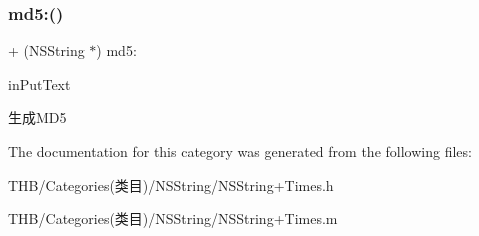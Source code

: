 \subsubsection{\texorpdfstring{md5\+:()}{md5:()}}
{\footnotesize\ttfamily + (N\+S\+String $\ast$) md5\+: \begin{DoxyParamCaption}\item[{(N\+S\+String $\ast$)}]{in\+Put\+Text }\end{DoxyParamCaption}}

生成\+M\+D5 

The documentation for this category was generated from the following files\+:\begin{DoxyCompactItemize}
\item 
T\+H\+B/\+Categories(类目)/\+N\+S\+String/N\+S\+String+\+Times.\+h\item 
T\+H\+B/\+Categories(类目)/\+N\+S\+String/N\+S\+String+\+Times.\+m\end{DoxyCompactItemize}

